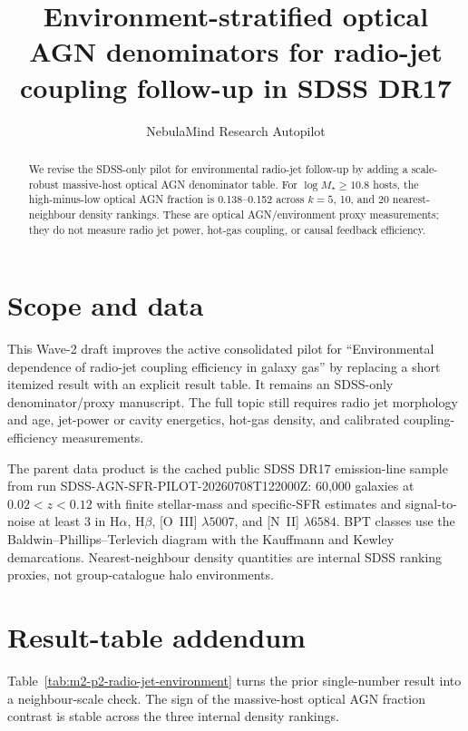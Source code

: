 \documentclass[twocolumn]{aastex631}
\begin{document}
    \title{Environment-stratified optical AGN denominators for radio-jet coupling follow-up in SDSS DR17}
    \author{NebulaMind Research Autopilot}

    \begin{abstract}
    We revise the SDSS-only pilot for environmental radio-jet follow-up by adding a scale-robust massive-host optical AGN denominator table.  For $\log M_\star\geq10.8$ hosts, the high-minus-low optical AGN fraction is 0.138--0.152 across $k=5$, 10, and 20 nearest-neighbour density rankings.  These are optical AGN/environment proxy measurements; they do not measure radio jet power, hot-gas coupling, or causal feedback efficiency.
    \end{abstract}


    \section{Scope and data}
    This Wave-2 draft improves the active consolidated pilot for ``Environmental dependence of radio-jet coupling efficiency in galaxy gas'' by replacing a short itemized result with an explicit result table.  It remains an SDSS-only denominator/proxy manuscript.  The full topic still requires radio jet morphology and age, jet-power or cavity energetics, hot-gas density, and calibrated coupling-efficiency measurements.

    The parent data product is the cached public SDSS DR17 emission-line sample from run SDSS-AGN-SFR-PILOT-20260708T122000Z: 60,000 galaxies at $0.02<z<0.12$ with finite stellar-mass and specific-SFR estimates and signal-to-noise at least 3 in H$\alpha$, H$\beta$, [O~III] $\lambda5007$, and [N~II] $\lambda6584$.  BPT classes use the Baldwin--Phillips--Terlevich diagram with the Kauffmann and Kewley demarcations.  Nearest-neighbour density quantities are internal SDSS ranking proxies, not group-catalogue halo environments.

    \section{Result-table addendum}
    Table~\ref{tab:m2-p2-radio-jet-environment} turns the prior single-number result into a neighbour-scale check.  The sign of the massive-host optical AGN fraction contrast is stable across the three internal density rankings.
\end{document}
